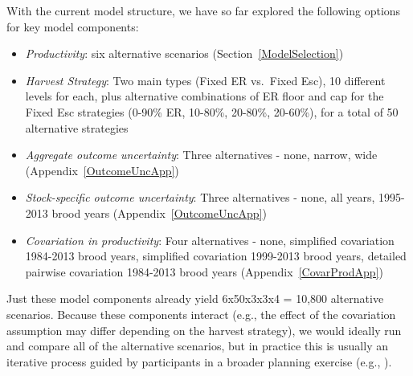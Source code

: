 \documentclass[french,11pt]{book}
\begin{document}
With the current model structure, we have so far explored the following options for key model components:
\begin{itemize}

\item
  \emph{Productivity}: six alternative scenarios (Section~\ref{ModelSelection})
\item
  \emph{Harvest Strategy}: Two main types (Fixed ER vs.~Fixed Esc), 10 different levels for each, plus alternative combinations of ER floor and cap for the Fixed Esc strategies (0-90\% ER, 10-80\%, 20-80\%, 20-60\%), for a total of 50 alternative strategies
\item
  \emph{Aggregate outcome uncertainty}: Three alternatives - none, narrow, wide (Appendix~\ref{OutcomeUncApp})
\item
  \emph{Stock-specific outcome uncertainty}: Three alternatives - none, all years, 1995-2013 brood years (Appendix~\ref{OutcomeUncApp})
\item
  \emph{Covariation in productivity}: Four alternatives - none, simplified covariation 1984-2013 brood years, simplified covariation 1999-2013 brood years, detailed pairwise covariation 1984-2013 brood years (Appendix~\ref{CovarProdApp})
\end{itemize}
Just these model components already yield 6x50x3x3x4 = 10,800 alternative scenarios. Because these components interact (e.g., the effect of the covariation assumption may differ depending on the harvest strategy), we would ideally run and compare all of the alternative scenarios, but in practice this is usually an iterative process guided by participants in a broader planning exercise (e.g., ).
\end{document}
